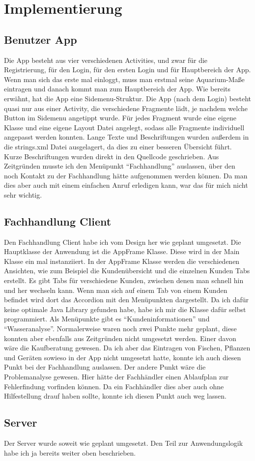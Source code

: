 \chapter{Implementierung}

\section{Benutzer App}

Die App besteht aus vier verschiedenen Activities, und zwar für die Registrierung, für den Login, für den ersten Login und für Hauptbereich der App. Wenn man sich das erste mal einloggt, muss man erstmal seine Aquarium-Maße eintragen und danach kommt man zum Hauptbereich der App. Wie bereits erwähnt, hat die App eine Sidemenu-Struktur. Die App (nach dem Login) besteht quasi nur aus einer Activity, die verschiedene Fragmente lädt, je nachdem welche Button im Sidemenu angetippt wurde. Für jedes Fragment wurde eine eigene Klasse und eine eigene Layout Datei angelegt, sodass alle Fragmente individuell angepasst werden konnten. Lange Texte und Beschriftungen wurden außerdem in die strings.xml Datei ausgelagert, da dies zu einer besseren Übersicht führt. Kurze Beschriftungen wurden direkt in den Quellcode geschrieben. Aus Zeitgründen musste ich den Menüpunkt ``Fachhandlung'' auslassen, über den noch Kontakt zu der Fachhandlung hätte aufgenommen werden können. Da man dies aber auch mit einem einfachen Anruf erledigen kann, war das für mich nicht sehr wichtig.

\section{Fachhandlung Client}

Den Fachhandlung Client habe ich vom Design her wie geplant umgesetzt. Die Hauptklasse der Anwendung ist die AppFrame Klasse. Diese wird in der Main Klasse ein mal instanziiert. In der AppFrame Klasse werden die verschiedenen Ansichten, wie zum Beispiel die Kundenübersicht und die einzelnen Kunden Tabs erstellt. Es gibt Tabs für verschiedene Kunden, zwischen denen man schnell hin und her wechseln kann. Wenn man sich auf einem Tab von einem Kunden befindet wird dort das Accordion mit den Menüpunkten dargestellt. Da ich dafür keine optimale Java Library gefunden habe, habe ich mir die Klasse dafür selbst programmiert. Als Menüpunkte gibt es ``Kundeninformationen'' und ``Wasseranalyse''. Normalerweise waren noch zwei Punkte mehr geplant, diese konnten aber ebenfalls aus Zeitgründen nicht umgesetzt werden. Einer davon wäre die Kaufberatung gewesen. Da ich aber das Eintragen von Fischen, Pflanzen und Geräten sowieso in der App nicht umgesetzt hatte, konnte ich auch diesen Punkt bei der Fachhandlung auslassen. Der andere Punkt wäre die Problemanalyse gewesen. Hier hätte der Fachhändler einen Ablaufplan zur Fehlerfindung vorfinden können. Da ein Fachhändler dies aber auch ohne Hilfestellung drauf haben sollte, konnte ich diesen Punkt auch weg lassen.

\section{Server}

Der Server wurde soweit wie geplant umgesetzt. Den Teil zur Anwendungslogik habe ich ja bereits weiter oben beschrieben.


